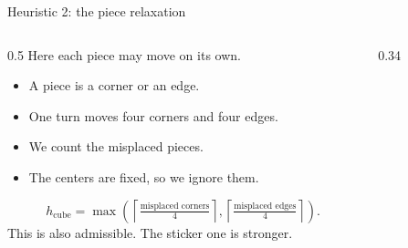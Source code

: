 \documentclass[10pt,aspectratio=169]{beamer}
\begin{document}
\begin{frame}{Heuristic 2: the piece relaxation}
  \begin{columns}[T,onlytextwidth]
    \hspace*{0.05\textwidth}
    \begin{column}{0.5\textwidth}
      Here each piece may move on its own.
      \vspace{0.15cm}
      \begin{itemize}
        \item A piece is a corner or an edge.
        \item One turn moves four corners and four edges.
        \item We count the misplaced pieces.
        \item The centers are fixed, so we ignore them.
      \end{itemize}
      \[
        h_{\text{cube}} = \max\left(
        \left\lceil \tfrac{\text{misplaced corners}}{4} \right\rceil,
        \left\lceil \tfrac{\text{misplaced edges}}{4} \right\rceil
        \right).
      \]
      This is also admissible. The sticker one is stronger.
    \end{column}
    \begin{column}{0.34\textwidth}
      \centering
      \vspace{0.7cm}
    \end{column}
  \end{columns}
\end{frame}
\end{document}
